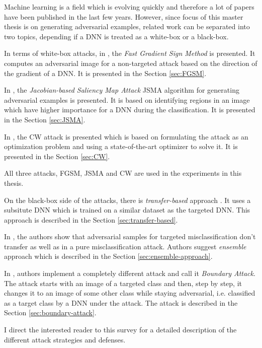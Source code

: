 Machine learning is a field which is evolving quickly and therefore a lot of papers have been published in the last few years. However, since focus of this master thesis is on generating adversarial examples, related work can be separated into two topics, depending if a DNN is treated as a white-box or a black-box. 

In terms of white-box attacks, in \cite{fgsm-original}, the \textit{Fast Gradient Sign Method} is presented. It computes an adversarial image for a non-targeted attack based on the direction of the gradient of a DNN. It is presented in the Section \ref{sec:FGSM}.

In \cite{DBLP:journals/corr/PapernotMJFCS15}, the \textit{Jacobian-based Saliency Map Attack} JSMA algorithm for generating adversarial examples is presented. It is based on identifying regions in an image which have higher importance for a DNN during the classification. It is presented in the Section \ref{sec:JSMA}.

In \cite{DBLP:journals/corr/CarliniW16a}, the CW attack is presented which is based on formulating the attack as an optimization problem and using a state-of-the-art optimizer to solve it.  It is presented in the Section \ref{sec:CW}.

All three attacks, FGSM, JSMA and CW are used in the experiments in this thesis.

On the black-box side of the attacks, there is \textit{transfer-based} approach 
\cite{DBLP:journals/corr/PapernotMGJCS16}. It uses a subsitute DNN which is trained on a similar dataset as the targeted DNN. This approach is described in the Section \ref{sec:transfer-based}.

In \cite{ensemble-attack}, the authors show that adversarial samples for targeted misclassification don't transfer as well as in a pure misclassification attack. Authors suggest \textit{ensemble} approach which is described in the Section \ref{sec:ensemble-approach}.

In \cite{brendel2018decisionbased}, authors implement a completely different attack and call it \textit{Boundary Attack}. The attack starts with an image of a targeted class and then, step by step, it changes it to an image of some other class while staying adversarial, i.e. classified as a target class by a DNN under the attack. The attack is described in the Section \ref{sec:boundary-attack}.

I direct the interested reader to this survey for a detailed description \cite{survey} of the different attack strategies and defenses.

